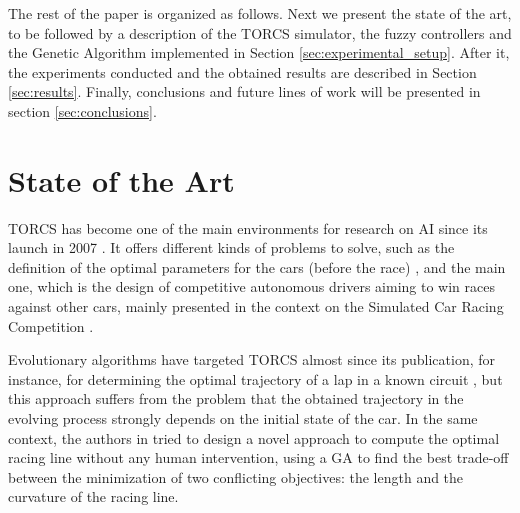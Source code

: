 \documentclass[conference]{IEEEtran}
\begin{document}

The rest of the paper is organized as follows. Next we present the
state of the art, to be followed by a description of the TORCS
simulator, the fuzzy controllers and the Genetic Algorithm implemented in Section \ref{sec:experimental_setup}. After it, the experiments conducted and the obtained results are described in Section \ref{sec:results}. Finally, conclusions and future lines of work will be presented in section \ref{sec:conclusions}.


\section{State of the Art}
\label{sec:soa}

TORCS has become one of the main environments for research on AI since its launch in 2007 \cite{WebTORCS}. It offers different kinds of problems to solve, such as the definition of the optimal parameters for the cars (before the race) \cite{Kole-ParamCarTunning12}, and the main one, which is the design of competitive autonomous drivers aiming to win races against other cars, mainly presented in the context on the Simulated Car Racing Competition \cite{SimulatedCarRacing-2008,SimulatedCarRacing2009}.

Evolutionary algorithms have targeted TORCS almost since its
publication, for instance, for determining the
optimal trajectory of a lap in a known circuit \cite{drivingGA2008},
but this approach suffers from the problem that the obtained
trajectory in the evolving process strongly depends on the initial
state of the car.  
In the same context, the authors in \cite{GaRaceLine2010} tried to design a novel approach to compute the optimal racing line without any human intervention, using a GA to find the best trade-off between
the minimization of two conflicting objectives: the length and
the curvature of the racing line.
\end{document}
